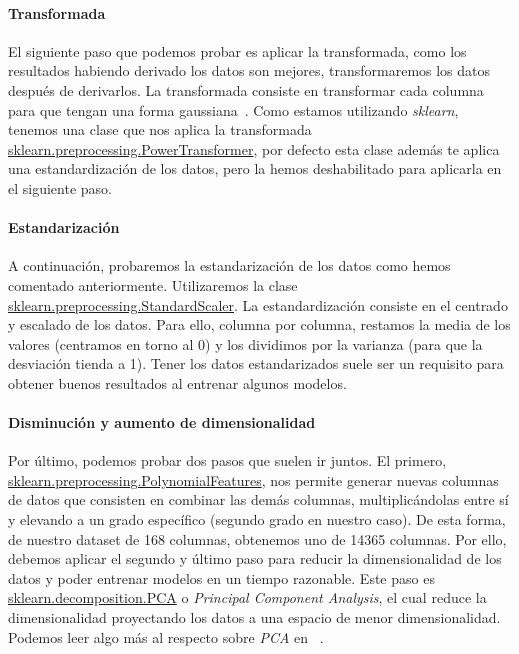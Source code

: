 \paragraph{Transformada}

El siguiente paso que podemos probar es aplicar la transformada, como los resultados habiendo derivado los datos son mejores, transformaremos los datos después de derivarlos. La transformada consiste en transformar cada columna para que tengan una forma gaussiana\ \cite{sklearnp39:online}. Como estamos utilizando \textit{sklearn}, tenemos una clase que nos aplica la transformada \href{https://scikit-learn.org/stable/modules/generated/sklearn.preprocessing.PowerTransformer.html}{sklearn.preprocessing.PowerTransformer}, por defecto esta clase además te aplica una estandardización de los datos, pero la hemos deshabilitado para aplicarla en el siguiente paso. 


\paragraph{Estandarización}

A continuación, probaremos la estandarización de los datos como hemos comentado anteriormente. Utilizaremos la clase \href{https://scikit-learn.org/stable/modules/generated/sklearn.preprocessing.StandardScaler.html}{sklearn.preprocessing.StandardScaler}. La estandardización consiste en el centrado y escalado de los datos. Para ello, columna por columna, restamos la media de los valores (centramos en torno al 0) y los dividimos por la varianza (para que la desviación tienda a 1). Tener los datos estandarizados suele ser un requisito para obtener buenos resultados al entrenar algunos modelos.\ \cite{sklearnp24:online}


\paragraph{Disminución y aumento de dimensionalidad}

Por último, podemos probar dos pasos que suelen ir juntos. El primero, \href{https://scikit-learn.org/stable/modules/generated/sklearn.preprocessing.PolynomialFeatures.html}{sklearn.preprocessing.PolynomialFeatures}, nos permite generar nuevas columnas de datos que consisten en combinar las demás columnas, multiplicándolas entre sí y elevando a un grado específico (segundo grado en nuestro caso). De esta forma, de nuestro \gls{dataset} de 168 columnas, obtenemos uno de 14365 columnas. Por ello, debemos aplicar el segundo y último paso para reducir la dimensionalidad de los datos y poder entrenar modelos en un tiempo razonable. Este paso es \href{https://scikit-learn.org/stable/modules/generated/sklearn.decomposition.PCA.html}{sklearn.decomposition.PCA} o \textit{Principal Component Analysis}, el cual reduce la dimensionalidad proyectando los datos a una espacio de menor dimensionalidad. Podemos leer algo más al respecto sobre \textit{PCA} en \ \cite{Principa62:online}. 



